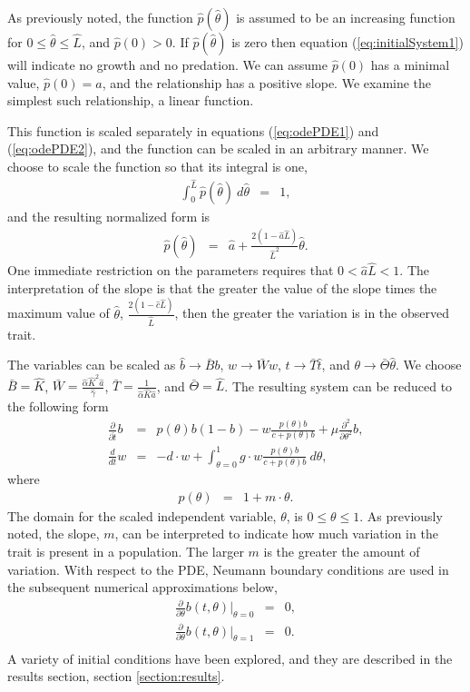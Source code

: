 \documentclass[12pt]{article}
\newcommand{\origB}{\hat{b}}
\newcommand{\origW}{\hat{w}}
\newcommand{\origAlpha}{\hat{\alpha}}
\newcommand{\origK}{\hat{K}}
\newcommand{\origGamma}{\hat{\gamma}}
\newcommand{\origA}{\hat{a}}
\newcommand{\origC}{\hat{c}}
\newcommand{\origL}{\hat{L}}
\newcommand{\origP}[1]{\hat{p}(#1)}
\newcommand{\origTheta}{\hat{\theta}}
\newcommand{\origT}{\hat{t}}
\begin{document}
As previously noted, the function $\origP{\origTheta}$ is assumed to be an
increasing function for $0\leq\origTheta\leq \origL$, and $\origP{0}>0$. If
$\origP{\origTheta}$ is zero then equation (\ref{eq:initialSystem1}) will
indicate no growth and no predation. We can assume $\origP{0}$ has a
minimal value, $\origP{0}=a$, and the relationship has a positive slope. We
examine the simplest such relationship, a linear function.

This function is scaled separately in equations (\ref{eq:odePDE1}) and
(\ref{eq:odePDE2}), and the function can be scaled in an arbitrary
manner. We choose to scale the function so that its integral is one,
\begin{eqnarray*}
  \int^{\origL}_0 \origP{\origTheta} ~ d\origTheta & = & 1,
\end{eqnarray*}
and the resulting normalized form is
\begin{eqnarray}
  \label{eq:linearFormP}
  \origP{\origTheta} & = & \origA + \frac{2(1-\origA\origL)}{\origL^2} \origTheta.
\end{eqnarray}
One immediate restriction on the parameters requires that
$0<\origA\origL<1$. The interpretation of the slope is that the greater the
value of the slope times the maximum value of $\origTheta$,
$\frac{2(1-\origC\origL)}{\origL}$, then the greater the variation is in the observed
trait.

The variables can be scaled as $\origB\rightarrow \bar{B}b$,
$\origW\rightarrow \bar{W}w$, $t\rightarrow \bar{T}\hat{t}$, and
$\theta\rightarrow \bar{\Theta}\hat{\theta}$. We choose $\bar{B}=\origK$,
$\bar{W}=\frac{\origAlpha \origK^2 \origA}{\origGamma}$, $\bar{T}=\frac{1}{\origAlpha \origK \origA}$,
and $\bar{\Theta}=\origL$. The resulting system can be reduced to the
following form
\begin{eqnarray}
  \label{eq:scaledodePDE1}
  \frac{\partial}{\partial \origT} b & = &
      p(\theta) b (1 - b)
      -  w \frac{p(\theta) b}{c+p(\theta)b}
      + \mu \frac{\partial^2}{\partial \theta^2} b , \\
  \label{eq:scaledodePDE2}
  \frac{d}{dt} w & = & -d \cdot w +
      \int^1_{\theta=0} g \cdot w \frac{p(\theta) b }{c + p(\theta) b} ~ d\theta,
\end{eqnarray}
where
\begin{eqnarray}
  p(\theta) & = & 1 + m \cdot \theta.
\end{eqnarray}
The domain for the scaled independent variable, $\theta$, is
$0\leq\theta\leq 1$. As previously noted, the slope, $m$, can be
interpreted to indicate how much variation in the trait is present in
a population. The larger $m$ is the greater the amount of variation.
With respect to the PDE, Neumann boundary conditions are used in the
subsequent numerical approximations below,
\begin{eqnarray*}
  \frac{\partial}{\partial\theta} b(t,\theta) \bigg|_{\theta=0} & = & 0, \\
  \frac{\partial}{\partial\theta} b(t,\theta) \bigg|_{\theta=1} & = & 0. \\
\end{eqnarray*}
A variety of initial
conditions have been explored, and they are described in the results
section, section \ref{section:results}.
\end{document}
